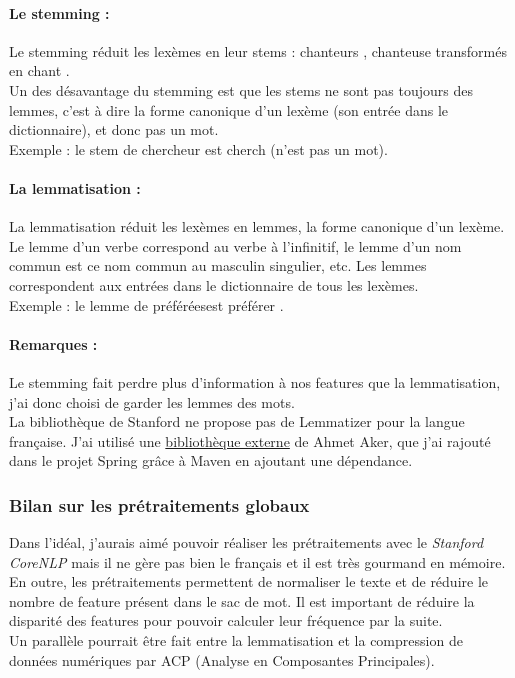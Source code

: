                 \paragraph{Le stemming :}
                    Le stemming réduit les lexèmes en leur stems : \og chanteurs \fg, \og chanteuse \fg transformés en \og chant \fg.\\
                    Un des désavantage du stemming est que les stems ne sont pas toujours des lemmes, c'est à dire la forme canonique d'un lexème (son entrée dans le dictionnaire), et donc pas un mot.\\
                    Exemple : le stem de \og chercheur \fg est \og cherch \fg (n'est pas un mot).

                \paragraph{La lemmatisation :}
                    La lemmatisation réduit les lexèmes en lemmes, la forme canonique d'un lexème. Le lemme d'un verbe correspond au verbe à l'infinitif, le lemme d'un nom commun est ce nom commun au masculin singulier, etc. Les lemmes correspondent aux entrées dans le dictionnaire de tous les lexèmes.\\
                    Exemple : le lemme de \og préférées\fg est \og préférer \fg.

                \paragraph{Remarques :}
                    Le stemming fait perdre plus d'information à nos features que la lemmatisation, j'ai donc choisi de garder les lemmes des mots.\\
                    La bibliothèque de Stanford ne propose pas de Lemmatizer pour la langue française. J'ai utilisé une \href{http://staffwww.dcs.shef.ac.uk/people/A.Aker/activityNLPProjects.html}{bibliothèque externe} de Ahmet Aker, que j'ai rajouté dans le projet Spring grâce à Maven en ajoutant une dépendance.

            \subsubsection{Bilan sur les prétraitements globaux}
                Dans l'idéal, j'aurais aimé pouvoir réaliser les prétraitements avec le \textit{Stanford CoreNLP} mais il ne gère pas bien le français et il est très gourmand en mémoire.\\
                En outre, les prétraitements permettent de normaliser le texte et de réduire le nombre de feature présent dans le sac de mot. Il est important de réduire la disparité des features pour pouvoir calculer leur fréquence par la suite.\\
                Un parallèle pourrait être fait entre la lemmatisation et la compression de données numériques par ACP (Analyse en Composantes Principales).

